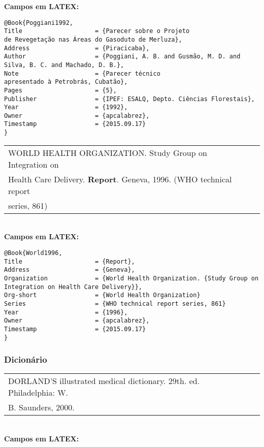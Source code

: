 \textbf{Campos em LATEX:}

\begin{verbatim}
@Book{Poggiani1992,
Title                    = {Parecer sobre o Projeto
de Revegetação nas Áreas do Gasoduto de Merluza},
Address                  = {Piracicaba},
Author                   = {Poggiani, A. B. and Gusmão, M. D. and 
Silva, B. C. and Machado, D. B.},
Note                     = {Parecer técnico
apresentado à Petrobrás, Cubatão},
Pages                    = {5},
Publisher                = {IPEF: ESALQ, Depto. Ciências Florestais},
Year                     = {1992},
Owner                    = {apcalabrez},
Timestamp                = {2015.09.17}
}
\end{verbatim}

\begin{tabular}{|l|c|} \hline
WORLD HEALTH ORGANIZATION.  Study Group on Integration on \\ Health Care Delivery.  \textbf{Report}. Geneva, 1996. (WHO technical report \\ series, 861)  \\\hline
\end{tabular}\\

\textbf{Campos em LATEX:}

\begin{verbatim}
@Book{World1996,
Title                    = {Report},
Address                  = {Geneva},
Organization             = {World Health Organization. {Study Group on 
Integration on Health Care Delivery}},
Org-short                = {World Health Organization}
Series                   = {WHO technical report series, 861}
Year                     = {1996},
Owner                    = {apcalabrez},
Timestamp                = {2015.09.17}
}
\end{verbatim}


\subsubsection{Dicionário}

\begin{tabular}{|l|c|} \hline
	DORLAND'S illustrated medical dictionary. 29th. ed. Philadelphia: W.\\B. Saunders, 2000.   \\\hline
\end{tabular}\\


\textbf{Campos em LATEX:}

